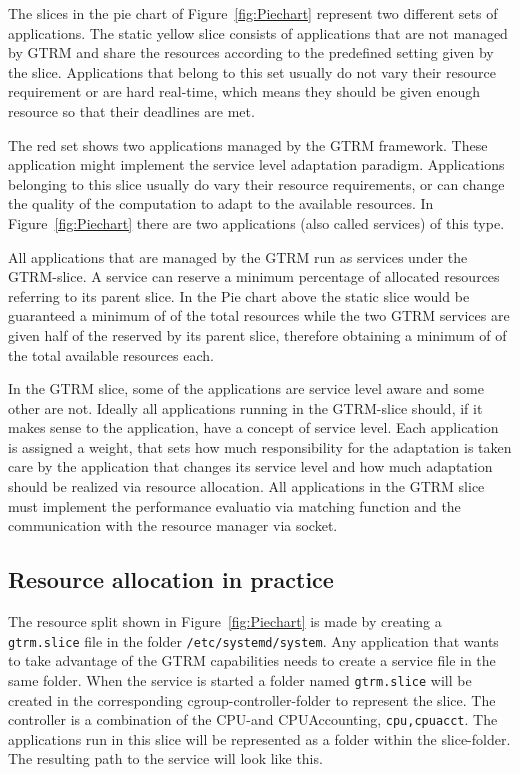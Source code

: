 \documentclass[nobiblatex]{LTHthesis}
\begin{document}
The slices in the pie chart of Figure~\ref{fig:Piechart} represent two
different sets of applications. The static yellow slice consists of
applications that are not managed by GTRM and share the resources
according to the predefined setting given by the slice. Applications
that belong to this set usually do not vary their resource requirement
or are hard real-time, which means they should be given enough resource
so that their deadlines are met. 

The red set shows two applications managed by the GTRM framework. These
application might implement the service level adaptation paradigm.
Applications belonging to this slice usually do vary their resource
requirements, or can change the quality of the computation to adapt to the
available resources. In Figure~\ref{fig:Piechart} there are two applications
(also called services) of this type.

All applications that are managed by the GTRM run as services under the 
GTRM-slice. A service can reserve a minimum percentage of allocated 
resources referring to its parent slice.
In the Pie chart above the static slice would be guaranteed a minimum of 
 of the total resources while the two GTRM services are given 
half of the  reserved by its parent slice, therefore obtaining
a minimum of  of the total available resources each.

In the GTRM slice, some of the applications are service level aware and some
other are not. Ideally all applications running in the GTRM-slice should, 
if it makes sense to the application, have a concept of service level.
Each application is assigned a weight, that sets how much responsibility
for the adaptation is taken care by the application that changes its service
level and how much adaptation should be realized via resource allocation.
All applications in the GTRM slice must implement the performance evaluatio
via matching function and the communication with the resource manager via
socket.

\subsection{Resource allocation in practice}
The resource split shown in Figure~\ref{fig:Piechart} is made by creating 
a \texttt{gtrm.slice} file in the folder \texttt{/etc/systemd/system}.
Any application that wants to take advantage of the GTRM capabilities needs
to create a service file in the same folder. When the service is started a folder named \texttt{gtrm.slice} will be created in the corresponding cgroup-controller-folder to represent the slice. The controller is a combination of the CPU-and CPUAccounting, \texttt{cpu,cpuacct}. The applications run in this slice will be represented as a folder within the slice-folder. The resulting path to the service will look like this.
\end{document}

